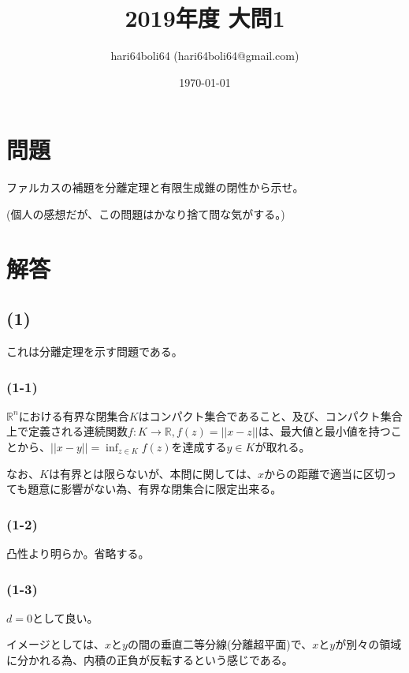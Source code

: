 \documentclass[a4paper, 10pt, dvipdfmx]{jlreq}
\begin{document}
\title{2019年度 大問1}
\author{hari64boli64 (hari64boli64@gmail.com)}
\date{\today}
\maketitle


\section{問題}

ファルカスの補題を分離定理と有限生成錐の閉性から示せ。

(個人の感想だが、この問題はかなり捨て問な気がする。)

\section{解答}

\subsection*{(1)}

これは分離定理を示す問題である。

\subsubsection*{(1-1)}

$\mathbb{R}^n$における有界な閉集合$K$はコンパクト集合であること、及び、コンパクト集合上で定義される連続関数$f:K \to \mathbb{R},f(z)=||x-z||$は、最大値と最小値を持つことから、$||x-y||=\inf_{z\in K}f(z)$を達成する$y \in K$が取れる。

なお、$K$は有界とは限らないが、本問に関しては、$x$からの距離で適当に区切っても題意に影響がない為、有界な閉集合に限定出来る。

\subsubsection*{(1-2)}

凸性より明らか。省略する。

\subsubsection*{(1-3)}

$d=0$として良い。

イメージとしては、$x$と$y$の間の垂直二等分線(分離超平面)で、$x$と$y$が別々の領域に分かれる為、内積の正負が反転するという感じである。
\end{document}
